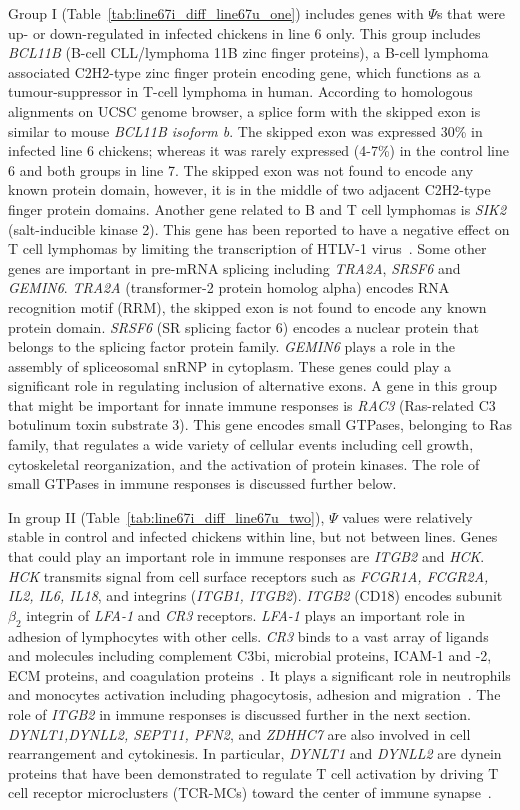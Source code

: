 \documentclass[10pt]{article}
\begin{document}
Group I (Table~\ref{tab:line67i_diff_line67u_one}) includes genes with $\Psi$s
that were up- or down-regulated in infected chickens in line 6 only.  This group
includes {\em BCL11B} (B-cell CLL/lymphoma 11B zinc finger proteins), a B-cell
lymphoma associated C2H2-type zinc finger protein encoding gene, which functions
as a tumour-suppressor in T-cell lymphoma in human.  According to homologous
alignments on UCSC genome browser, a splice form with the skipped exon is
similar to mouse {\em BCL11B isoform b}.  The skipped exon was expressed 30\% in
infected line 6 chickens; whereas it was rarely expressed (4-7\%) in the control
line 6 and both groups in line 7.  The skipped exon was not found to encode any
known protein domain, however, it is in the middle of two adjacent C2H2-type
finger protein domains.  Another gene related to B and T cell lymphomas is {\em
SIK2} (salt-inducible kinase 2).  This gene has been reported to have a negative
effect on T cell lymphomas by limiting the transcription of HTLV-1
virus~\cite{tang2013lkb1}.  Some other genes are important in pre-mRNA splicing
including {\em TRA2A}, {\em SRSF6} and {\em GEMIN6}.  {\em TRA2A} (transformer-2
protein homolog alpha) encodes RNA recognition motif (RRM), the skipped exon is
not found to encode any known protein domain.  {\em SRSF6} (SR splicing factor
6) encodes a nuclear protein that belongs to the splicing factor protein family.
{\em GEMIN6} plays a role in the assembly of spliceosomal snRNP in cytoplasm.
These genes could play a significant role in regulating inclusion of alternative
exons.  A gene in this group that might be important for innate immune responses
is {\em RAC3} (Ras-related C3 botulinum toxin substrate 3).  This gene encodes
small GTPases, belonging to Ras family, that regulates a wide variety of
cellular events including cell growth, cytoskeletal reorganization, and the
activation of protein kinases.  The role of small GTPases in immune responses is
discussed further below.

In group II (Table~\ref{tab:line67i_diff_line67u_two}), $\Psi$ values were
relatively stable in control and infected chickens within line, but not between
lines.  Genes that could play an important role in immune responses are {\em
ITGB2} and {\em HCK}.  {\em HCK} transmits signal from cell surface receptors
such as {\em FCGR1A, FCGR2A, IL2, IL6, IL18}, and integrins ({\em ITGB1,
ITGB2}).  {\em ITGB2} (CD18) encodes subunit $\beta_{2}$ integrin of {\em LFA-1}
and {\em CR3} receptors.  {\em LFA-1} plays an important role in adhesion of
lymphocytes with other cells.  {\em CR3} binds to a vast array of ligands and
molecules including complement C3bi, microbial proteins, ICAM-1 and -2, ECM
proteins, and coagulation proteins~\cite{}.  It plays a significant role in
neutrophils and monocytes activation including phagocytosis, adhesion and
migration~\cite{}.  The role of {\em ITGB2} in immune responses is discussed
further in the next section.  {\em DYNLT1,DYNLL2, SEPT11, PFN2}, and {\em
ZDHHC7} are also involved in cell rearrangement and cytokinesis.  In particular,
{\em DYNLT1} and {\em DYNLL2} are dynein proteins that have been demonstrated to
regulate T cell activation by driving T cell receptor microclusters (TCR-MCs)
toward the center of immune synapse~\cite{hashimoto2011dynein}.
\end{document}
